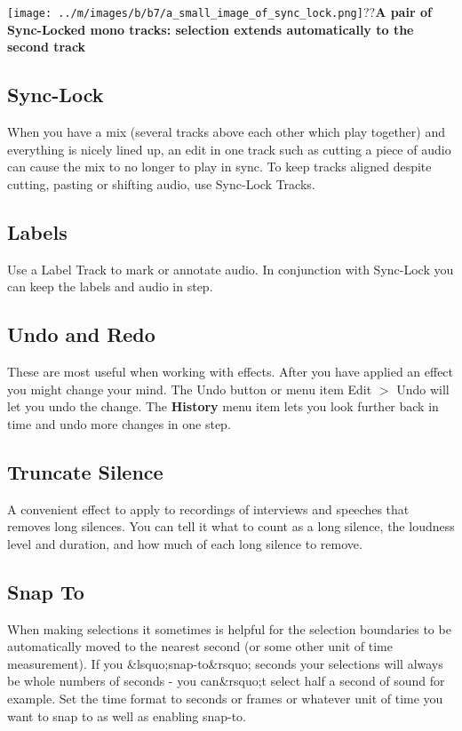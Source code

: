 \documentclass[twocolumn]{book}
\begin{document}
\texttt{[image: ../m/images/b/b7/a\_small\_image\_of\_sync\_lock.png]}??\textbf{A pair of Sync-Locked mono tracks: selection extends automatically to the second track}

\subsection{Sync-Lock}


When you have a mix (several tracks above each other which play together) and everything is nicely lined up, an edit in one track such as cutting a piece of audio can cause the mix to no longer to play in sync. To keep tracks aligned despite cutting, pasting or shifting audio, use Sync-Lock Tracks.

\subsection{Labels}


Use a Label Track to mark or annotate audio.  In conjunction with Sync-Lock you can keep the labels and audio in step.

\subsection{Undo and Redo}


These are most useful when working with effects.  After you have applied an effect you might change your mind.  The Undo button or menu item Edit \mbox{$>$} Undo will let you undo the change. The \textbf{History} menu item lets you look further back in time and undo more changes in one step.

\subsection{Truncate Silence}


A convenient effect to apply to recordings of interviews and speeches that removes long silences.  You can tell it what to count as a long silence, the loudness level and duration, and how much of each long silence to remove.

\subsection{Snap To}


When making selections it sometimes is helpful for the selection boundaries to be automatically moved to the nearest second (or some other unit of time measurement).  If you \&lsquo;snap-to\&rsquo; seconds your selections will always be whole numbers of seconds - you can\&rsquo;t select half a second of sound for example.  Set the time format to seconds or frames or whatever unit of time you want to snap to as well as enabling snap-to.
\end{document}
